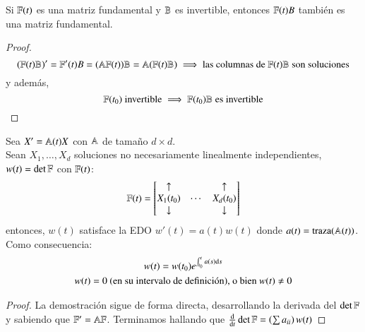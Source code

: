 \begin{pro}\label{pro:fund-producto}
    Si $\mathbb{F}(t)$ es una matriz fundamental y $\mathbb{B}$ es invertible, entonces $\mathbb{F}(t) B$ también es una matriz fundamental.
\end{pro}
\begin{proof}
    $$
        (\mathbb{F}(t)\mathbb{B})' = \mathbb{F}'(t)B = (\mathbb{A} \mathbb{F}(t)) \mathbb{B} = \mathbb{A}(\mathbb{F}(t) \mathbb{B}) \implies \text{las columnas de $\mathbb{F}(t)\mathbb{B}$ son soluciones}
    $$
    y además,
    $$
        \mathbb{F}(t_0) \text{ invertible} \implies \mathbb{F}(t_0)\mathbb{B} \text{ es invertible}
    $$
\end{proof}

\begin{pro}
    Sea $X' = \mathbb{A}(t) X$ con $\mathbb{A}$ de tamaño $d \times d$.\\
    Sean $X_1, \ldots, X_d$ soluciones no necesariamente linealmente independientes, $w(t) = \det\mathbb{F}$ con $\mathbb{F}(t)$:
    $$
        \F(t) =
            \mx{\uparrow && \uparrow\\ X_1(t_0) & \cdots & X_d(t_0) \\ \downarrow && \downarrow}
    $$
    entonces, $w(t)$ satisface la EDO $w'(t) = a(t) w(t)$ donde $a(t) = \operatorname{traza}(\mathbb{A}(t))$.\\
    Como consecuencia:
    \begin{gather*}
        w(t) = w(t_0) e^{\int_{t_0}^t a(s) \mathrm{d} s}\\
        w(t) = 0 \text{ (en su intervalo de definición), o bien } w(t) \neq 0
    \end{gather*}
\end{pro}
\begin{proof}
    La demostración sigue de forma directa, desarrollando la derivada del $\det\mathbb{F}$ y sabiendo que $\mathbb{F}' = \mathbb{A} \mathbb{F}$. Terminamos hallando que $\frac{\mathrm{d}}{\mathrm{d}t} \det \mathbb{F} = \left(\sum a_{ii}\right) w(t)$
\end{proof}

